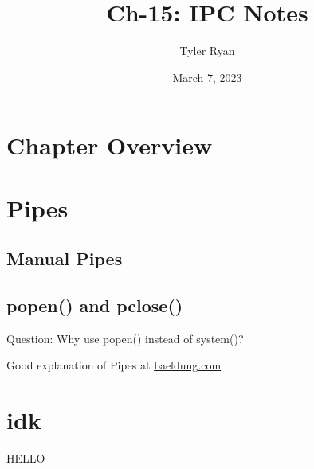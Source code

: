 \documentclass{article}
\author{Tyler Ryan}
\title{Ch-15: IPC Notes}
\date{March 7, 2023}
\begin{document}
\maketitle
\tableofcontents
\clearpage
\section{Chapter Overview}
\section{Pipes}
\subsection{Manual Pipes}
\subsection{popen() and pclose()}
Question: Why use popen() instead of system()?

Good explanation of Pipes at \href{https://www.baeldung.com/cs/pipes-vs-sockets}{baeldung.com}\newline


\section{idk}
HELLO
\end{document}
